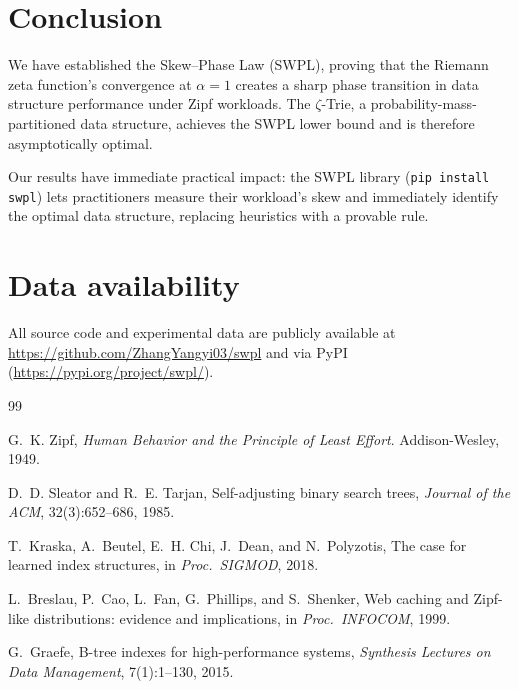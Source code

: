 \documentclass[preprint,12pt,authoryear]{elsarticle}
\begin{document}
\section{Conclusion}

We have established the Skew--Phase Law (SWPL), proving that the
Riemann zeta function's convergence at $\alpha = 1$ creates a
sharp phase transition in data structure performance under
Zipf workloads.  The $\zeta$-Trie, a probability-mass-partitioned
data structure, achieves the SWPL lower bound and is therefore
asymptotically optimal.

Our results have immediate practical impact: the SWPL library
(\verb|pip install swpl|) lets practitioners measure their
workload's skew and immediately identify the optimal data
structure, replacing heuristics with a provable rule.

\section*{Data availability}

All source code and experimental data are publicly available at
\url{https://github.com/ZhangYangyi03/swpl} and via PyPI
(\url{https://pypi.org/project/swpl/}).

\begin{thebibliography}{99}

G.~K. Zipf, \emph{Human Behavior and the Principle of Least Effort}.
Addison-Wesley, 1949.

D.~D. Sleator and R.~E. Tarjan, Self-adjusting binary search trees,
\emph{Journal of the ACM}, 32(3):652--686, 1985.

T.~Kraska, A.~Beutel, E.~H. Chi, J.~Dean, and N.~Polyzotis,
The case for learned index structures, in \emph{Proc.~SIGMOD}, 2018.

L.~Breslau, P.~Cao, L.~Fan, G.~Phillips, and S.~Shenker,
Web caching and Zipf-like distributions: evidence and implications,
in \emph{Proc.~INFOCOM}, 1999.

G.~Graefe, B-tree indexes for high-performance systems,
\emph{Synthesis Lectures on Data Management}, 7(1):1--130, 2015.

\end{thebibliography}
\end{document}
